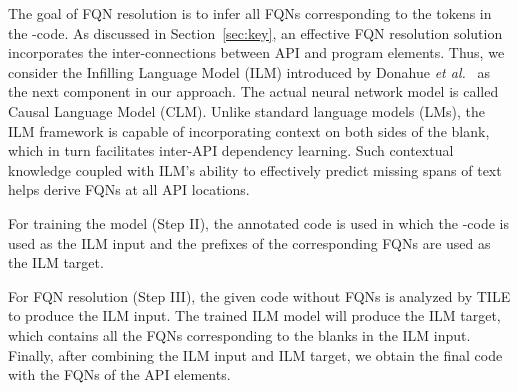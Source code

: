 The goal of FQN resolution is to infer all FQNs corresponding to the
 tokens in the -code. As discussed in
Section~\ref{sec:key}, an effective FQN resolution solution
incorporates the inter-connections between API and program
elements. Thus, we consider the Infilling Language Model (ILM)
introduced by Donahue {\em et al.}~\cite{} as the next component in
our approach. The actual neural network model is called Causal
Language Model (CLM). Unlike standard language models (LMs), the ILM
framework is capable of incorporating context on both sides of the
blank, which in turn facilitates inter-API dependency learning. Such
contextual knowledge coupled with ILM's ability to effectively predict
missing spans of text helps \tool derive FQNs at all API
locations.

For training the model (Step II), the annotated code is used
in which the -code is used as the ILM input and the prefixes
of the corresponding FQNs are used as the ILM target.

For FQN resolution (Step III), the given code without FQNs is analyzed
by TILE to produce the ILM input. The trained ILM model will produce
the ILM target, which contains all the FQNs corresponding to the
blanks in the ILM input. Finally, after combining the ILM input and
ILM target, we obtain the final code with the FQNs of the API elements.


